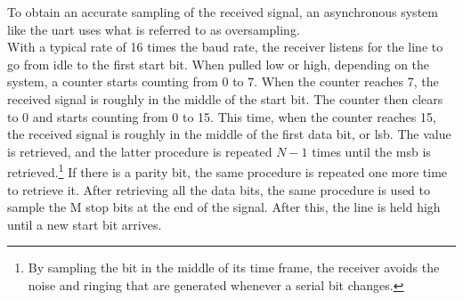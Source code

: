 \documentclass[main.tex]{subfiles}
\begin{document}
To obtain an accurate sampling of the received signal, an asynchronous system like the \gls{uart} uses what is referred to as oversampling. \\
With a typical rate of 16 times the baud rate, the receiver listens for the line to go from idle to the first start bit. When pulled low or high, depending on the system, a counter starts counting from 0 to 7. When the counter reaches 7, the received signal is roughly in the middle of the start bit. The counter then clears to 0 and starts counting from 0 to 15. This time, when the counter reaches 15, the received signal is roughly in the middle of the first data bit, or \acrshort{lsb}. The value is retrieved, and the latter procedure is repeated $N - 1$ times until the \acrshort{msb} is retrieved.\footnote{By sampling the bit in the middle of its time frame, the receiver avoids the noise and ringing that are generated whenever a serial bit changes.\cite{rapid08}} If there is a parity bit, the same procedure is repeated one more time to retrieve it. After retrieving all the data bits, the same procedure is used to sample the M stop bits at the end of the signal. After this, the line is held high until a new start bit arrives. 

\end{document}
